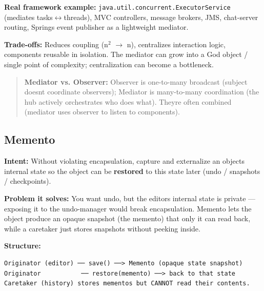 \documentclass[11pt]{article}
\begin{document}
\textbf{Real framework example:} \texttt{java.util.concurrent.ExecutorService} (mediates tasks\(\leftrightarrow\)threads), MVC controllers, message brokers, JMS, chat-server routing, Spring\textquotesingle s event publisher as a lightweight mediator.

\textbf{Trade-offs:} Reduces coupling (n\(^2\) \(\rightarrow\) n), centralizes interaction logic, components reusable in isolation. The mediator can grow into a God object / single point of complexity; centralization can become a bottleneck.

\begin{quote}
\textbf{Mediator vs. Observer:} Observer is one-to-many broadcast (subject doesn\textquotesingle t coordinate observers); Mediator is many-to-many coordination (the hub actively orchestrates who does what). They\textquotesingle re often combined (mediator uses observer to listen to components).
\end{quote}

\subsection{Memento}\label{memento}

\textbf{Intent:} Without violating encapsulation, capture and externalize an object\textquotesingle s internal state so the object can be \textbf{restored} to this state later (undo / snapshots / checkpoints).

\textbf{Problem it solves:} You want undo, but the editor\textquotesingle s internal state is private --- exposing it to the undo-manager would break encapsulation. Memento lets the object produce an opaque snapshot (the memento) that only it can read back, while a caretaker just stores snapshots without peeking inside.

\textbf{Structure:}

\setcodelang{}

\begin{verbatim}
Originator (editor) ── save() ──> Memento (opaque state snapshot)
Originator           ── restore(memento) ──> back to that state
Caretaker (history) stores mementos but CANNOT read their contents.
\end{verbatim}

\end{document}
